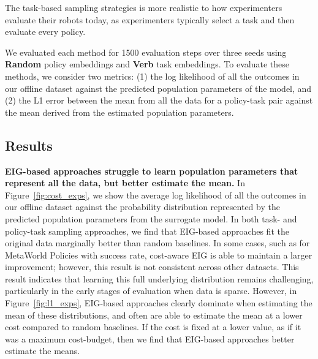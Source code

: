 The task-based sampling strategies is more realistic to how experimenters evaluate their robots today, as experimenters typically select a task and then evaluate every policy.

We evaluated each method for 1500 evaluation steps over three seeds using \textbf{Random} policy embeddings and \textbf{Verb} task embeddings.
To evaluate these methods, we consider two metrics: (1) the log likelihood of all the outcomes in our offline dataset against the predicted population parameters of the model, and (2) the L1 error between the mean from all the data for a policy-task pair against the mean derived from the estimated population parameters. 


\subsection{Results}







\textbf{EIG-based approaches struggle to learn population parameters that represent all the data, but better estimate the mean.}
In Figure~\ref{fig:cost_exps}, we show the average log likelihood of all the outcomes in our offline dataset against the probability distribution represented by the predicted population parameters from the surrogate model.
In both task- and policy-task sampling approaches, we find that EIG-based approaches fit the original data marginally better than random baselines.
In some cases, such as for MetaWorld Policies with success rate, cost-aware EIG is able to maintain a larger improvement; however, this result is not consistent across other datasets.
This result indicates that learning this full underlying distribution remains challenging, particularly in the early stages of evaluation when data is sparse. 
However, in Figure~\ref{fig:l1_exps}, EIG-based approaches clearly dominate when estimating the mean of these distributions, and often are able to estimate the mean at a lower cost compared to random baselines.
If the cost is fixed at a lower value, as if it was a maximum cost-budget, then we find that EIG-based approaches better estimate the means.

